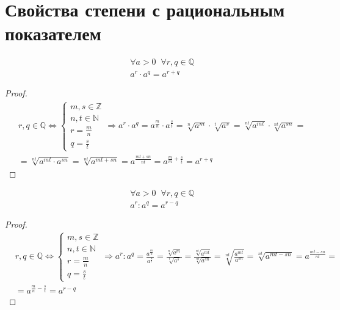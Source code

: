 \section{Свойства степени с рациональным показателем}

\begin{theorem}
    \begin{align*}
        &\forall a > 0 \;\; \forall r, q \in \mathbb{Q} \\
        &a^r \cdot a^q = a^{r + q}
    \end{align*}
\end{theorem}

\begin{proof}
    \begin{align*}
        &r, q \in \mathbb{Q} \iff
        \left\{\begin{array}{l}
            m,s \in \mathbb{Z} \\
            n,t \in \mathbb{N} \\
            r = \frac{m}{n} \\
            q = \frac{s}{t}
        \end{array}\right. \Rightarrow
        a^r \cdot a^q = a^\frac{m}{n} \cdot a^\frac{s}{t} = \sqrt[n]{a^m} \cdot \sqrt[t]{a^s} = \sqrt[nt]{a^{mt}} \cdot \sqrt[nt]{a^{sn}} = \\
        &= \sqrt[nt]{a^{mt} \cdot a^{sn}} = \sqrt[nt]{a^{mt + sn}}
        = a^\frac{mt + sn}{nt} = a^{\frac{m}{m} + \frac{s}{t}} = a^{r + q}
    \end{align*}
\end{proof}

\begin{theorem}
    \begin{align*}
        &\forall a > 0 \;\; \forall r, q \in \mathbb{Q} \\
        &a^r : a^q = a^{r - q}
    \end{align*}
\end{theorem}

\begin{proof}
    \begin{align*}
        &r, q \in \mathbb{Q} \iff
        \left\{\begin{array}{l}
            m,s \in \mathbb{Z} \\
            n,t \in \mathbb{N} \\
            r = \frac{m}{n} \\
            q = \frac{s}{t}
        \end{array}\right. \Rightarrow
        a^r : a^q = \frac{a^\frac{m}{n}}{a^\frac{s}{t}} = \frac{\sqrt[n]{a^m}}{\sqrt[t]{a^s}} = \frac{\sqrt[nt]{a^{mt}}}{\sqrt[nt]{a^{sn}}}
        = \sqrt[nt]{\frac{a^{mt}}{a^{sn}}} = \sqrt[nt]{a^{mt - sn}} = a^\frac{mt - sn}{nt} = \\
        &= a^{\frac{m}{n} - \frac{s}{t}} = a^{r - q}
    \end{align*}
\end{proof}

